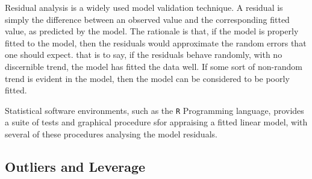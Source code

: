 \documentclass[12pt, a4paper]{article}
\begin{document}
			
			
			
			
			
			
			
			
			
			
			
			Residual analysis is a widely used model validation technique. A residual is simply the difference between an observed value and the corresponding fitted value, as predicted by the model. The rationale is that, if the model is properly fitted to the model, then the residuals would approximate the random errors that one should expect.
			that is to say, if the residuals behave randomly, with no discernible trend, the model has fitted the data well. If some sort of non-random trend is evident in the model, then the model can be considered to be poorly fitted.
			
			
			Statistical software environments, such as the \texttt{R} Programming language, provides a suite of tests and graphical procedure sfor appraising a fitted linear model, with several 
			of these procedures analysing the model residuals.
			
			
			
			
			
			\subsection{Outliers and Leverage}
			
\end{document}
